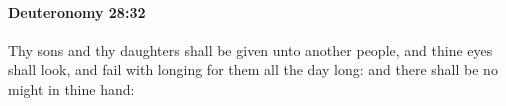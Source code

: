 
		\paragraph{Deuteronomy 28:32} %
			\label{DEUTERONOMY-28-32}

			Thy sons and thy daughters shall be given unto another people, and thine eyes shall look, and fail with longing for them all the day long: and there shall be no might in thine hand:


